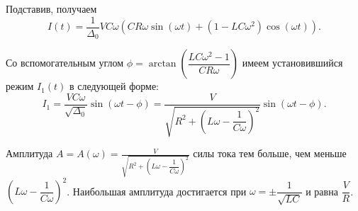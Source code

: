 \documentclass[a5paper,10pt]{article}
\newcommand{\br}[1]{\left(#1\right)}
\theoremstyle{definition}
\begin{document}
Подставив, получаем
$$I\br{t} = \frac{1}{\Delta_{0}} VC\omega \br{CR\omega \sin\br{\omega t} + \br{1 - LC\omega^2} \cos\br{\omega t}}.$$

Со вспомогательным углом $\phi = \arctan\br{\dfrac{LC\omega^2 - 1}{CR\omega}}$ имеем установившийся режим $I_{1}\br{t}$ в следующей форме:
$$I_{1} = \frac {VC\omega} {\sqrt{\Delta_{0}}} \sin\br{\omega t - \phi} = \frac {V} {\sqrt{R^2 + \br{L\omega - \dfrac {1}{C\omega}}^2}} \sin\br{\omega t - \phi}.$$

Амплитуда $A = A\br{\omega} = \displaystyle{\frac {V} {\sqrt{R^2 + \br{L\omega - \dfrac {1}{C\omega}}^2}} }$ силы тока тем больше, чем меньше $\br{L\omega - \dfrac {1}{C\omega}}^2$. Наибольшая амплитуда достигается при $\omega = \pm \dfrac{1}{\sqrt{LC}}$ и равна $\dfrac {V} {R}$.
\end{document}
